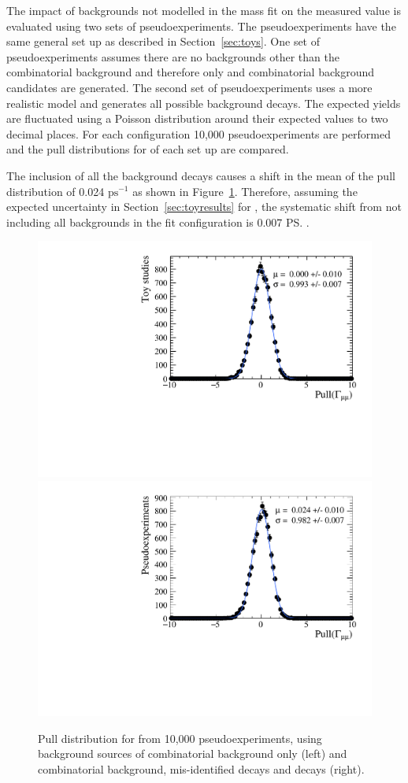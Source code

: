 The impact of backgrounds not modelled in the mass fit on the measured \tmumu value is evaluated using two sets of pseudoexperiments. The pseudoexperiments have the same general set up as described in Section~\ref{sec:toys}. One set of pseudoexperiments assumes there are no backgrounds other than the combinatorial background and therefore only \bsmumu and combinatorial background candidates are generated. The second set of pseudoexperiments uses a more realistic model and generates all possible background decays. The expected yields are fluctuated using a Poisson distribution around their expected values to two decimal places. For each configuration 10,000 pseudoexperiments are performed and the pull distributions for \Gmumu of each set up are compared. %

The inclusion of all the background decays causes a shift in the mean of the \Gmumu pull distribution of 0.024 $\mathrm{ps}^{-1}$ as shown in Figure~\ref{fig:bkdcontam}. Therefore, assuming the expected uncertainty in Section~\ref{sec:toyresults} for \tmumu, the systematic shift from not including all backgrounds in the fit configuration is 0.007 \ps.%

\begin{figure}[tbp]
    \centering
        \includegraphics[width=0.49 \textwidth]{./Figs/LifetimeSystematics/Gamma_pull_mass_pdf_Run1.pdf}
        \includegraphics[width=0.49 \textwidth]{./Figs/LifetimeSystematics/5320_all_bkgnds_gamma_pull_CKM.pdf}
    \caption{Pull distribution for \Gmumu from 10,000 pseudoexperiments, using background sources of combinatorial background only (left) and combinatorial background, mis-identified decays and \bdmumu decays (right).}
    \label{fig:bkdcontam}
\end{figure}


